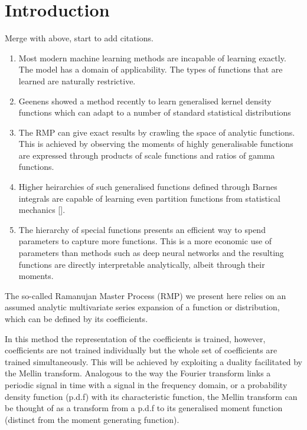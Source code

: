 \documentclass[journal=jcisd8,manuscript=article,layout=onecolumn,pdftex,floatfix,amsmath,amssymb,10pt]{achemso}
\begin{document}
\section{Introduction}
{\color{red} Merge with above, start to add citations.}

\begin{enumerate}
\item Most modern machine learning methods are incapable of learning exactly. The model has a domain of applicability. The types of functions that are learned are naturally restrictive.
\item Geenens \cite{Geenens2017} showed a method recently to learn generalised kernel density functions which can adapt to a number of standard statistical distributions
\item The RMP can give exact results by crawling the space of analytic functions. This is achieved by observing the moments of highly generalisable functions are expressed through products of scale functions and ratios of gamma functions.
\item Higher heirarchies of such generalised functions defined through Barnes integrals are capable of learning even partition functions from statistical mechanics [\cite{I function}].
\item The hierarchy of special functions presents an efficient way to spend parameters to capture more functions. This is a more economic use of parameters than methods such as deep neural networks and the resulting functions are directly interpretable analytically, albeit through their moments.
\end{enumerate}

The so-called Ramanujan Master Process (RMP) we present here relies on an assumed analytic multivariate series expansion of a function or distribution, which can be defined by its coefficients. 

In this method the representation of the coefficients is trained, however, coefficients are not trained individually but the whole set of coefficients are trained simultaneously. This will be achieved by exploiting a duality facilitated by the Mellin transform. Analogous to the way the Fourier transform links a periodic signal in time with a signal in the frequency domain, or a probability density function (p.d.f) with its characteristic function, the Mellin transform can be thought of as a transform from a p.d.f to its generalised moment function (distinct from the moment generating function). \par
\end{document}
